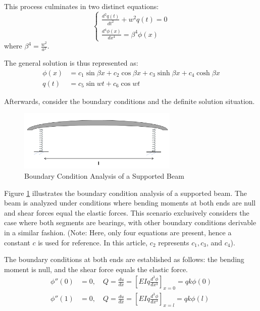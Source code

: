 \documentclass[conference]{IEEEtran}
\begin{document}
This process culminates in two distinct equations:
\begin{equation}
\left\{
\begin{array}{l}
\frac{d^2 q(t)}{dt^2} + w^2 q(t) = 0 \\
\frac{d^4 \phi(x)}{dx^4} = \beta^4 \phi(x)
\end{array}
\right.
\end{equation}
where \( \beta^4 = \frac{w^2}{a^2} \).

The general solution is thus represented as:
\begin{equation}
\begin{split}
\phi(x) &= c_1 \sin \beta x + c_2 \cos \beta x + c_3 \sinh \beta x + c_4 \cosh \beta x \\
q(t) &= c_5 \sin wt + c_6 \cos wt
\end{split}
\end{equation}


Afterwards, consider the boundary conditions and the definite solution situation. 
\begin{figure}[ht!] %
\centering
\includegraphics[width=3.0in]{2.png}
\caption{Boundary Condition Analysis of a Supported Beam}
\label{2}
\end{figure}
Figure \ref{2} illustrates the boundary condition analysis of a supported beam. The beam is analyzed under conditions where bending moments at both ends are null and shear forces equal the elastic forces. This scenario exclusively considers the case where both segments are bearings, with other boundary conditions derivable in a similar fashion. (Note: Here, only four equations are present, hence a constant \( c \) is used for reference. In this article, \( c_2 \) represents \( c_1, c_3 \), and \( c_4 \)).

The boundary conditions at both ends are established as follows: the bending moment is null, and the shear force equals the elastic force.
\begin{equation}
\begin{aligned}
\phi''(0) &= 0, \quad Q = \frac{du}{dx}= \left[ EI q\frac{d^3 \phi}{dx^3} \right]_{x=0} = qk\phi{}(0) \\
\phi''(1) &= 0, \quad Q = \frac{du}{dx}= \left[ EI q\frac{d^3 \phi}{dx^3} \right]_{x=l} = qk\phi{}(l)
\end{aligned}
\end{equation}
\end{document}
